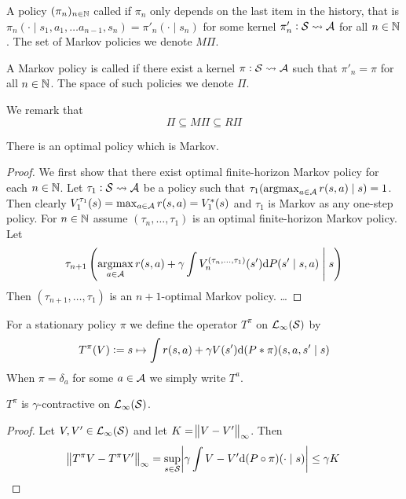 \documentclass{article}
\begin{document}
\begin{defn}
  A policy $(\pi_n)_{n \in \mathbb{N}}$ called 
  if $\pi_n$ only depends on the last item in the history,
  that is $\pi_n(\cdot \mid s_1, a_1, \dots a_{n-1}, s_n)
  = \pi'_n(\cdot \mid s_n)$ for some kernel $\pi'_n : \mathcal{S}
  \leadsto \mathcal{A}$ for all $n \in \mathbb{N}$. The set of Markov policies
  we denote $M\Pi$.
 
  A Markov policy is called 
  if there exist a kernel $\pi : \mathcal{S} \leadsto \mathcal{A}$ such that
  $\pi'_n = \pi$ for all $n \in \mathbb{N}$.
  The space of such policies we denote $\Pi$.
\end{defn}
We remark that
\[ \Pi \subseteq M\Pi \subseteq R\Pi \]
\begin{prop}
  There is an optimal policy which is Markov.
\end{prop}
\begin{proof}
  We first show that there exist optimal finite-horizon Markov policy
  for each $n \in \mathbb{N}$.
  Let $\tau_1: \mathcal{S} \leadsto \mathcal{A}$ be a policy such that
  $\tau_1(\operatorname*{argmax}_{a \in \mathcal{A}} r(s, a) \mid s) = 1$.
  Then clearly
  $V^{\tau_1}_1(s) = \max_{a \in \mathcal{A}} r(s, a) = V^*_1(s)$
  and $\tau_1$ is Markov as any one-step policy.
  For $n \in \mathbb{N}$ assume
  $(\tau_{n}, \dots, \tau_1)$ is an optimal finite-horizon
  Markov policy.
  Let
  \[ \tau_{n+1}\left(\operatorname*{argmax}_{a \in \mathcal{A}} r(s, a) + 
      \gamma \int V_n^{(\tau_n, \dots, \tau_1)}(s') \mathrm{d} P(s' \mid s, a)
  \;\middle\vert\; s \right) \]
  Then $(\tau_{n+1}, \dots, \tau_1)$ is an $n+1$-optimal Markov policy.
  \dots
\end{proof}

\begin{defn}
  For a stationary policy $\pi$ we define the operator
  $T^\pi$ on $\mathcal{L}_\infty(\mathcal{S})$ by
  \[ T^\pi(V) \vcentcolon= s \mapsto \int r(s, a)
  + \gamma V(s') \mathrm{d} (P * \pi)(s, a, s'\mid s) \]
  When $\pi = \delta_a$ for some $a \in \mathcal{A}$ we simply write $T^a$.
\end{defn}

\begin{prop}
  $T^\pi$ is $\gamma$-contractive on $\mathcal{L}_\infty(\mathcal{S})$.
\end{prop}
\begin{proof}
  Let $V, V' \in \mathcal{L}_\infty(\mathcal{S})$
  and let $K = \norm{V - V'}_\infty$.
  Then
  \[ \norm{T^\pi V - T^\pi V'}_\infty
    = \sup_{s \in \mathcal{S}} \abs{ \gamma
    \int V - V' \mathrm{d} (P \circ \pi)(\cdot \mid s)}
  \leq \gamma K \]
\end{proof}
\end{document}
